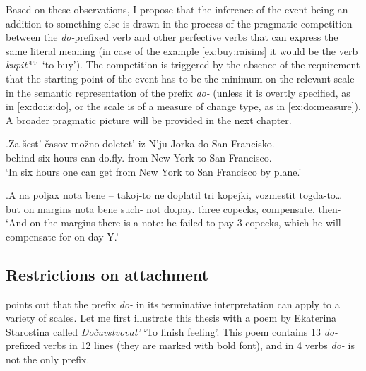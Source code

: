 Based on these observations, I propose that the inference of the event being an addition to something else is drawn in the process of the pragmatic competition between the \textit{do-}prefixed verb and other perfective verbs that can express the same literal meaning (in case of the example \ref{ex:buy:raisins} it would be the verb \textit{kupit'$^{\textsc{pf}}$} `to buy'). The competition is triggered by the absence of the requirement that the starting point of the event has to be the minimum on the relevant scale in the semantic representation of the prefix \textit{do-} (unless it is overtly specified, as in \ref{ex:do:iz:do}, or the scale is of a measure of change type, as in \ref{ex:do:measure}). A broader pragmatic picture will be provided in the next chapter.

\exg.\label{ex:do:iz:do}Za \v{s}est' \v{c}asov mo\v{z}no doletet' iz N'ju-Jorka do San-Francisko.\\
behind six hours can do.fly. from {New York} to {San Francisco}.\\
\trans `In six hours one can get from New York to San Francisco by plane.'\\

\exg.\label{ex:do:measure}A na poljax nota bene -- takoj-to ne doplatil tri kopejki, vozmestit togda-to…\\
but on margins nota bene {} such- not do.pay. three copecks, compensate. then-\\
\trans `And on the margins there is a note: he failed to pay 3 copecks, which he will compensate for on day Y.'

\subsection{Restrictions on attachment}
\citet[236]{Kagan:12} points out that the prefix \textit{do-} in its terminative interpretation can apply to a variety of scales. Let me first illustrate this thesis with a poem by Ekaterina Starostina called \textit{Do\v{c}uvstvovat'} `To finish feeling'. This poem contains 13 \textit{do-}prefixed verbs in 12 lines (they are marked with bold font), and in 4 verbs \textit{do-} is not the only prefix.

